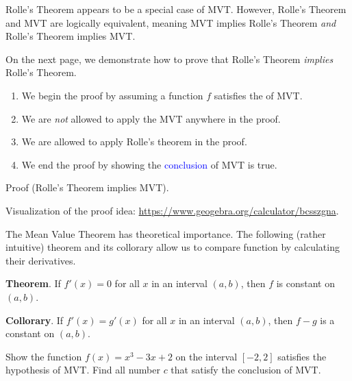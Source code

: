 \documentclass[../main.tex]{subfiles}
\begin{document}
Rolle's Theorem appears to be a special case of MVT.  However, Rolle's Theorem and MVT are logically equivalent, meaning MVT implies Rolle's Theorem \emph{and} Rolle's Theorem implies MVT. 

On the next page, we demonstrate how to prove that Rolle's Theorem \emph{implies} Rolle's Theorem. 
\begin{enumerate}
  \item We begin the proof by assuming a function \(f\) satisfies the  of MVT.
  \item We are \emph{not} allowed to apply the MVT anywhere in the proof.
  \item We are allowed to apply Rolle's theorem in the proof.
  \item We end the proof by showing the \textcolor{blue}{conclusion} of MVT is true.
\end{enumerate}

\clearpage
Proof (Rolle's Theorem implies MVT). 

Visualization of the proof idea: \url{https://www.geogebra.org/calculator/bcsszgna}.

\clearpage
The Mean Value Theorem has theoretical importance. The following (rather intuitive) theorem and its collorary allow us to compare function by calculating their derivatives. 
\bigskip

\begin{FlushRight}
\footnotesize{}
\end{FlushRight}
\textbf{Theorem}. If \(f'(x) = 0\) for all \(x\) in an interval \((a,b)\), then \(f\) is constant on \((a,b)\).
\vfill


\begin{FlushRight}
\footnotesize{}
\end{FlushRight}
\textbf{Collorary}. If \(f'(x) = g'(x)\) for all \(x\) in an interval \((a,b)\), then \(f-g\) is a constant on \((a,b)\). 
\vspace{2in}
\clearpage

\begin{example}
  Show the function \(f(x) = x^{3} - 3x + 2\) on the interval \([-2,2]\) satisfies the hypothesis of MVT. Find all number \(c\) that satisfy the conclusion of MVT.
\end{example}
\end{document}
